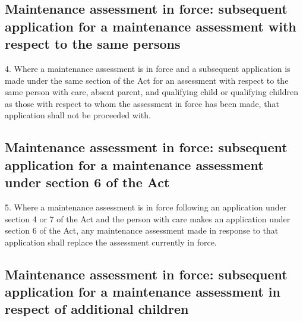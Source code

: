 \documentclass[a4paper,12pt]{article}
\begin{document}

\subsection*{Maintenance assessment in force: subsequent application for a maintenance assessment with respect to the same persons}

4.  Where a maintenance assessment is in force and a subsequent application is made under the same section of the Act for an assessment with respect to the same person with care, absent parent, and qualifying child or qualifying children as those with respect to whom the assessment in force has been made, that application shall not be proceeded with. 


\subsection*{Maintenance assessment in force: subsequent application for a maintenance assessment under section 6 of the Act}

5.  Where a maintenance assessment is in force following an application under section 4 or 7 of the Act and the person with care makes an application under section 6 of the Act, any maintenance assessment made in response to that application shall replace the assessment currently in force.

\subsection*{Maintenance assessment in force: subsequent application for a maintenance assessment in respect of additional children}
\end{document}
